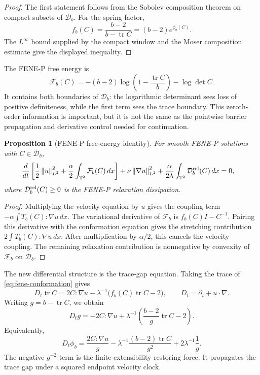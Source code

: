 \documentclass[11pt]{article}
\newtheorem{proposition}{Proposition}[section]
\newcommand{\T}{\mathbb T}
\newcommand{\Id}{I}
\newcommand{\tr}{\operatorname{tr}}
\newcommand{\dd}{\,dx}
\newcommand{\calD}{\mathcal D}
\newcommand{\calF}{\mathcal F}
\newcommand{\norm}[1]{\left\lVert #1\right\rVert}
\begin{document}
\begin{proof}
The first statement follows from the Sobolev composition theorem on compact
subsets of \(\calD_b\).  For the spring factor,
\[
  f_b(C)=\frac{b-2}{b-\tr C}=(b-2)e^{\phi_b(C)}.
\]
The \(L^\infty\) bound supplied by the compact window and the Moser
composition estimate give the displayed inequality.
\end{proof}

The FENE-P free energy is
\[
  \calF_b(C)=
  -(b-2)\log\left(1-\frac{\tr C}{b}\right)-\log\det C .
\]
It contains both boundaries of \(\calD_b\): the logarithmic determinant sees
loss of positive definiteness, while the first term sees the trace boundary.
This zeroth-order information is important, but it is not the same as the
pointwise barrier propagation and derivative control needed for continuation.

\begin{proposition}[FENE-P free-energy identity]
\label{prop:fene-free-energy-unified}
For smooth FENE-P solutions with \(C\in\calD_b\),
\begin{align}
  &\frac{d}{dt}\left[
    \frac12\norm{u}_{L^2}^2
    +\frac{\alpha}{2}
      \int_{\T^2}\calF_b(C)\dd
  \right]
  +\nu\norm{\nabla u}_{L^2}^2
  +\frac{\alpha}{2\lambda}
    \int_{\T^2}\calD_b^{\rm rel}(C)\dd
  =0,
  \label{eq:fene-free-energy-unified}
\end{align}
where \(\calD_b^{\rm rel}(C)\ge0\) is the FENE-P relaxation dissipation.
\end{proposition}

\begin{proof}
Multiplying the velocity equation by \(u\) gives the coupling term
\(-\alpha\int T_b(C):\nabla u\dd\).  The variational derivative of
\(\calF_b\) is \(f_b(C)\Id-C^{-1}\).  Pairing this derivative with the
conformation equation gives the stretching contribution
\(2\int T_b(C):\nabla u\dd\).  After multiplication by \(\alpha/2\), this
cancels the velocity coupling.  The remaining relaxation contribution is
nonnegative by convexity of \(\calF_b\) on \(\calD_b\).
\end{proof}

The new differential structure is the trace-gap equation.  Taking the trace of
\eqref{eq:fene-conformation} gives
\[
  D_t\tr C=2C:\nabla u-\lambda^{-1}\bigl(f_b(C)\tr C-2\bigr),
  \qquad D_t=\partial_t+u\cdot\nabla .
\]
Writing \(g=b-\tr C\), we obtain
\begin{equation}
  D_tg
  =
  -2C:\nabla u
  +\lambda^{-1}\left(\frac{b-2}{g}\tr C-2\right).
  \label{eq:fene-gap-unified}
\end{equation}
Equivalently,
\begin{equation}
  D_t\phi_b
  =
  \frac{2C:\nabla u}{g}
  -\lambda^{-1}\frac{(b-2)\tr C}{g^2}
  +2\lambda^{-1}\frac1g .
  \label{eq:fene-barrier-unified}
\end{equation}
The negative \(g^{-2}\) term is the finite-extensibility restoring force.  It
propagates the trace gap under a squared endpoint velocity clock.
\end{document}
